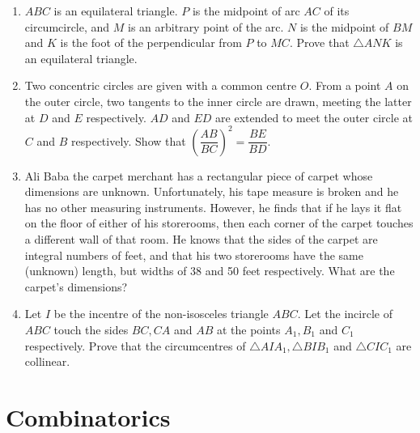 \documentclass[12pt]{scrartcl}
\begin{document}
\begin{enumerate}[resume]
    \item $ABC$ is an equilateral triangle. $P$ is the midpoint of arc $AC$ of its circumcircle, and $M$ is an arbitrary point of the arc. $N$ is the midpoint of $BM$ and $K$ is the foot of the perpendicular from $P$ to $MC$. Prove that $\triangle ANK$ is an equilateral triangle.

    \item Two concentric circles are given with a common centre $O$. From a point $A$ on the outer circle, two tangents to the inner circle are drawn, meeting the latter at $D$ and $E$ respectively. $AD$ and $ED$ are extended to meet the outer circle at $C$ and $B$ respectively. Show that $(\dfrac{AB}{BC})^{2}=\dfrac{BE}{BD}$.

    \item Ali Baba the carpet merchant has a rectangular piece of carpet whose dimensions are unknown. Unfortunately, his tape measure is broken and he has no other measuring instruments. However, he finds that if he lays it flat on the floor of either of his storerooms, then each corner of the carpet touches a different wall of that room. He knows that the sides of the carpet are integral numbers of feet, and that his two storerooms have the same (unknown) length, but widths of 38 and 50 feet respectively. What are the carpet's dimensions?

    \item Let $I$ be the incentre of the non-isosceles triangle $ABC$. Let the incircle of $ABC$ touch the sides $BC, CA$ and $AB$ at the points $A_{1}, B_{1}$ and $C_{1}$ respectively. Prove that the circumcentres of $\triangle AIA_{1}, \triangle BIB_{1}$ and $\triangle CIC_{1}$ are collinear.
\end{enumerate}


\section*{Combinatorics}
\end{document}
